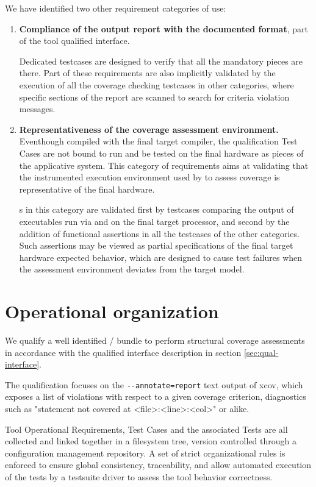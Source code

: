 \documentclass {report}
\begin{document}
We have identified two other requirement categories of use:

\begin{enumerate}
\item \textbf{Compliance of the output report with the documented format},
part of the tool qualified interface.

Dedicated testcases are designed to verify that all the mandatory pieces are
there.
%
Part of these requirements are also implicitly validated by the execution of
all the coverage checking testcases in other categories, where specific
sections of the report are scanned to search for criteria violation messages.

\item \textbf{Representativeness of the coverage assessment environment.}
%
Eventhough compiled with the final target compiler, the qualification Test
Cases are not bound to run and be tested on the final hardware as pieces of
the applicative system.
%
This category of requirements aims at validating that the instrumented
execution environment used by \xcov{} to assess coverage is representative of
the final hardware.

\tor{}s in this category are validated first by testcases comparing the output
of executables run via \xcov{} and on the final target processor, and second
by the addition of functional assertions in all the testcases of the other
categories.
%
Such assertions may be viewed as partial specifications of the final target
hardware expected behavior, which are designed to cause test failures when the
assessment environment deviates from the target model.
\end{enumerate}

\section{Operational organization}

We qualify a well identified \xcov{}/\qemu{} bundle to perform structural
coverage assessments in accordance with the qualified interface description in
section \ref{sec:qual-interface}.

The qualification focuses on the \verb|--annotate=report| text output of xcov,
which exposes a list of violations with respect to a given coverage criterion,
diagnostics such as "statement not covered at <file>:<line>:<col>" or alike.

Tool Operational Requirements, Test Cases and the associated Tests are
all collected and linked together in a filesystem tree, version controlled
through a configuration management repository.
%
A set of strict organizational rules is enforced to ensure global consistency,
traceability, and allow automated execution of the tests by a testsuite driver
to assess the tool behavior correctness.
\end{document}

